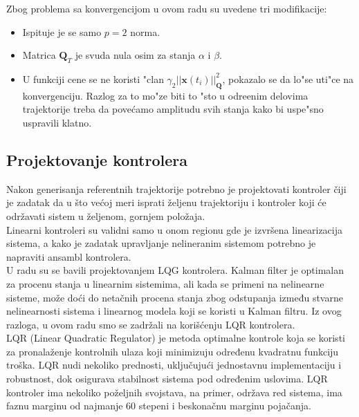 \documentclass[a4paper,11pt]{article}
\theoremstyle{definition} \newtheorem{deff}{Definicija}[section]
\theoremstyle{definition} \newtheorem{prim}[deff]{Primer}
\theoremstyle{plain} \newtheorem{teor}[deff]{Teorema}
\begin{document}
	Zbog problema sa konvergencijom u ovom radu su uvedene tri modifikacije:
	\begin{itemize}
		\item Ispituje je se samo $p=2$ norma.
		\item Matrica $\mathbf{Q}_T$ je svuda nula osim za stanja $\alpha$ i $\beta$.
		\item U funkciji cene se ne koristi "clan $\gamma_2||\mathbf{x}(t_i)||^2_{\mathbf{Q}}$, pokazalo se da lo"se uti"ce na konvergenciju. Razlog za to mo"ze biti to "sto u odre\dj enim delovima trajektorije treba da pove\'camo amplitudu svih stanja kako bi uspe"sno uspravili klatno.
	\end{itemize}
	
	
	
	
	
	
	
	
	
	
	
	 
	
	
	\newpage
	\subsection{Projektovanje kontrolera}\label{sec:LQR}
	
	Nakon generisanja referentnih trajektorije potrebno je projektovati kontroler čiji je zadatak da u što većoj meri isprati željenu trajektoriju i kontroler koji će održavati sistem u željenom, gornjem položaja. \\
	
	Linearni kontroleri su validni samo u onom regionu gde je izvršena linearizacija sistema, a kako je zadatak upravljanje nelineranim sistemom potrebno je napraviti ansambl kontrolera. \\
	
	U radu \cite{inicijalna} su se bavili projektovanjem LQG kontrolera. Kalman filter je optimalan za procenu stanja u linearnim sistemima, ali kada se primeni na nelinearne sisteme, može doći do netačnih procena stanja zbog odstupanja između stvarne nelinearnosti sistema i linearnog modela koji se koristi u Kalman filtru. Iz ovog razloga, u ovom radu smo se zadržali na korišćenju LQR kontrolera. \\
	
	LQR (Linear Quadratic Regulator) je metoda optimalne kontrole koja se koristi za pronalaženje kontrolnih ulaza koji minimizuju određenu kvadratnu funkciju troška. LQR nudi nekoliko prednosti, uključujući jednostavnu implementaciju i robustnost, dok osigurava stabilnost sistema pod određenim uslovima. LQR kontroler ima nekoliko poželjnih svojstava, na primer, održava red sistema, ima faznu marginu od najmanje 60 stepeni i beskonačnu marginu pojačanja.\\
	
\end{document}
